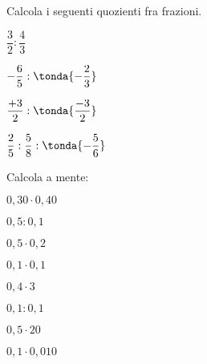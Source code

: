 \begin{esercizio}
 \label{ese:3.52}
Calcola i seguenti quozienti fra frazioni.

\begin{htmulticols}{4}
\begin{enumeratees}
\item \(\dfrac{3}{2}:\dfrac{4}{3}\)
\item \(-\dfrac{6}{5}:\tonda{-\dfrac{2}{3}}\)
\item \(\dfrac{+3}{2}:\tonda{\dfrac{-3}{2}}\)
\item \(\dfrac{2}{5}:\dfrac{5}{8}:\tonda{-\dfrac{5}{6}}\)
\end{enumeratees}
\end{htmulticols}
\end{esercizio}


\begin{esercizio}
 \label{ese:3.55}
Calcola a mente:

\begin{htmulticols}{4}
 \begin{enumeratees}
 \spazielenx
\item \(0,30\cdot0,40\)
\item \(0,5:0,1\)
\item \(0,5\cdot0,2\)
\item \(0,1\cdot0,1\)
\item \(0,4\cdot3\)
\item \(0,1:0,1\)
\item \(0,5\cdot20\)
\item \(0,1\cdot0,010\)
 \end{enumeratees}
\end{htmulticols}
\end{esercizio}


